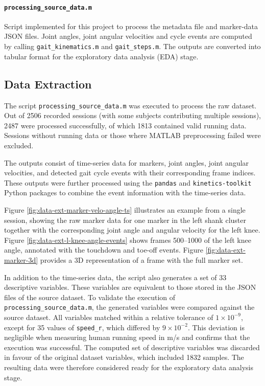 \paragraph{\texttt{processing\_source\_data.m}}  
Script implemented for this project to process the metadata file and marker-data JSON files. Joint angles, joint angular velocities and cycle events are computed by calling \texttt{gait\_kinematics.m} and \texttt{gait\_steps.m}. The outputs are converted into tabular format for the exploratory data analysis (EDA) stage.


\subsection{Data Extraction}\label{subsec:data-extraction}

The script \texttt{processing\_source\_data.m} was executed to process the raw dataset. Out of 2506 recorded sessions (with some subjects contributing multiple sessions), 2487 were processed successfully, of which 1813 contained valid running data. Sessions without running data or those where MATLAB preprocessing failed were excluded.  

The outputs consist of time-series data for markers, joint angles, joint angular velocities, and detected gait cycle events with their corresponding frame indices. These outputs were further processed using the \texttt{pandas} and \texttt{kinetics-toolkit} Python packages to combine the event information with the time-series data.  

Figure \ref{fig:data-ext-marker-velo-angle-ts} illustrates an example from a single session, showing the raw marker data for one marker in the left shank cluster together with the corresponding joint angle and angular velocity for the left knee. Figure \ref{fig:data-ext-l-knee-angle-events} shows frames 500--1000 of the left knee angle, annotated with the touchdown and toe-off events. Figure \ref{fig:data-ext-marker-3d} provides a 3D representation of a frame with the full marker set.  

In addition to the time-series data, the script also generates a set of 33 descriptive variables. These variables are equivalent to those stored in the JSON files of the source dataset. To validate the execution of \texttt{processing\_source\_data.m}, the generated variables were compared against the source dataset. All variables matched within a relative tolerance of $1 \times 10^{-9}$, except for 35 values of \texttt{speed\_r}, which differed by $9 \times 10^{-2}$. This deviation is negligible when measuring human running speed in m/s and confirms that the execution was successful. The computed set of descriptive variables was discarded in favour of the original dataset variables, which included 1832 samples. The resulting data were therefore considered ready for the exploratory data analysis stage.

